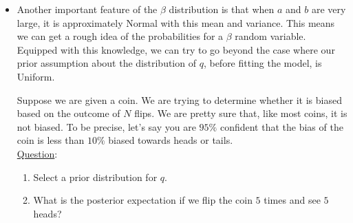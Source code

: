 \begin{itemize}
\item 
Another important feature of the $\beta$ distribution is that when $a$ and $b$ are very large, it is approximately Normal with this mean and variance. This means we can get a rough idea of the probabilities for a $\beta$ random variable. Equipped with this knowledge, we can try to go beyond the case where our prior assumption about the distribution of $q$, before fitting the model, is Uniform. 

\begin{example}\label{ex:beta2}
Suppose we are given a coin. We are trying to determine whether it is biased based on the outcome of $N$ flips. We are pretty sure that, like most coins, it is not biased. To be precise, let's say you are $95\%$ confident that the bias of the coin is less than $10\%$ biased towards heads or tails.\\

\noindent 
\underline{Question}: 
\begin{enumerate}[label=(\alph*)]
\item Select a prior distribution for $q$. 
\item What is the posterior expectation if we flip the coin $5$ times and see $5$ heads? \\
\end{enumerate} 



\end{example}
\end{itemize}
